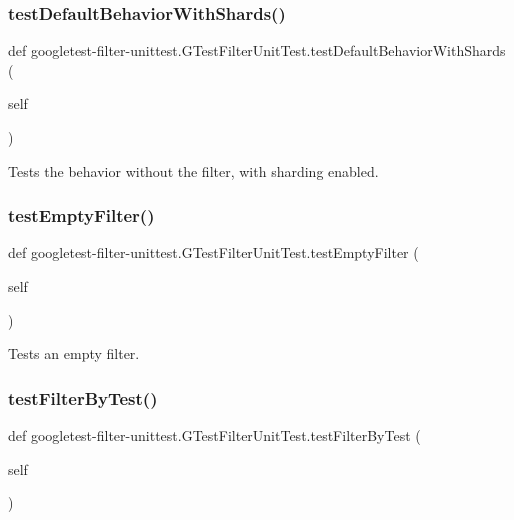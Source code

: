 \subsubsection{\texorpdfstring{testDefaultBehaviorWithShards()}{testDefaultBehaviorWithShards()}}
{\footnotesize\ttfamily def googletest-\/filter-\/unittest.\+G\+Test\+Filter\+Unit\+Test.\+test\+Default\+Behavior\+With\+Shards (\begin{DoxyParamCaption}\item[{}]{self }\end{DoxyParamCaption})}

\begin{DoxyVerb}Tests the behavior without the filter, with sharding enabled.\end{DoxyVerb}
 \mbox{\label{classgoogletest-filter-unittest_1_1GTestFilterUnitTest_aeaa447047f82973a4ef02e20d5cb2d19}} 
\subsubsection{\texorpdfstring{testEmptyFilter()}{testEmptyFilter()}}
{\footnotesize\ttfamily def googletest-\/filter-\/unittest.\+G\+Test\+Filter\+Unit\+Test.\+test\+Empty\+Filter (\begin{DoxyParamCaption}\item[{}]{self }\end{DoxyParamCaption})}

\begin{DoxyVerb}Tests an empty filter.\end{DoxyVerb}
 \mbox{\label{classgoogletest-filter-unittest_1_1GTestFilterUnitTest_a5665345aa2e94412fd65b19bc5077342}} 
\subsubsection{\texorpdfstring{testFilterByTest()}{testFilterByTest()}}
{\footnotesize\ttfamily def googletest-\/filter-\/unittest.\+G\+Test\+Filter\+Unit\+Test.\+test\+Filter\+By\+Test (\begin{DoxyParamCaption}\item[{}]{self }\end{DoxyParamCaption})}


